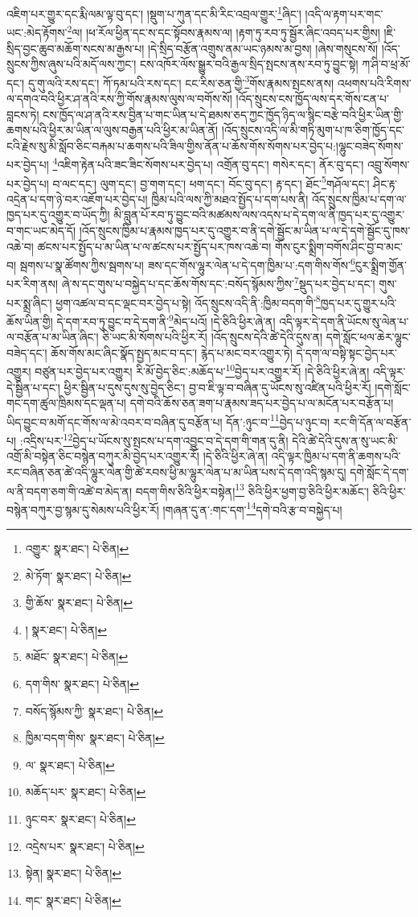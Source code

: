 འཇིག་པར་གྱུར་དང་རྨི་ལམ་ལྟ་བུ་དང་། །སྡུག་པ་ཀུན་དང་མི་རིང་འབྲལ་གྱུར་\footnote{འགྱུར་  སྣར་ཐང་།  པེ་ཅིན། }ཞིང་། །འདི་ལ་རྟག་པར་གང་ཡང་:མེད་རྟོགས་\footnote{མེ་ཏོག་  སྣར་ཐང་།  པེ་ཅིན། }ལ། །ཕ་རོལ་ཕྱིན་དང་ས་དང་སྟོབས་རྣམས་ལ། །རྟག་ཏུ་རབ་ཏུ་སྦྱོར་ཞིང་འབད་པར་གྱིས། །ཇི་སྲིད་བྱང་ཆུབ་མཆོག་སངས་མ་རྒྱས་པ། །དེ་སྲིད་བརྩོན་འགྲུས་ནམ་ཡང་ཉམས་མ་བྱས། །ཞེས་གསུངས་སོ། །འོད་སྲུངས་ཀྱིས་ཞུས་པའི་མདོ་ལས་ཀྱང་། ངས་འཁོར་ལོས་སྒྱུར་བའི་རྒྱལ་སྲིད་སྤངས་ནས་རབ་ཏུ་བྱུང་སྟེ། ཀ་ཤི་བ་ཕྲ་མོ་དང་། དུ་གུ་ལའི་རས་དང་། ཀོ་ཏམ་པའི་རས་དང་། ངང་རིས་ཅན་གྱི་\footnote{གྱི་ཆོས་  སྣར་ཐང་།  པེ་ཅིན། }གོས་རྣམས་སྤངས་ནས། འཕགས་པའི་རིགས་ལ་དགའ་བའི་ཕྱིར་ཤ་ནའི་རས་ཀྱི་གོས་རྣམས་ལུས་ལ་བགོས་སོ། །འོད་སྲུངས་ངས་ཁྱོད་ལས་དར་གོས་ངན་པ་བླངས་ཏེ། ངས་ཁྱོད་ལ་ཤ་ནའི་རས་བྱིན་པ་གང་ཡིན་པ་དེ་ཐམས་ཅད་ཀྱང་ཁྱོད་ཉིད་ལ་སྙིང་བརྩེ་བའི་ཕྱིར་ཡིན་གྱི་ཆགས་པའི་ཕྱིར་མ་ཡིན་ལ་ལུས་བརྒྱན་པའི་ཕྱིར་མ་ཡིན་ནོ། །འོད་སྲུངས་འདི་ལ་མི་གཏི་མུག་པ་ཁ་ཅིག་ཁྱོད་དང་ངའི་རྗེས་སུ་མི་སློབ་ཅིང་བརྐམ་པ་ཆགས་པའི་ཟིལ་གྱིས་ནོན་པ་ཆོས་གོས་སོགས་པར་བྱེད་པ:།ལྷུང་བཟེད་སོགས་པར་བྱེད་པ། \footnote{།   སྣར་ཐང་།  པེ་ཅིན། }འཇིག་རྟེན་པའི་ཟང་ཟིང་སོགས་པར་བྱེད་པ། འགྲོན་བུ་དང་། གསེར་དང་། ནོར་བུ་དང་། འབྲུ་སོགས་པར་བྱེད་པ། བ་ལང་དང་། ལུག་དང་། བྱ་གག་དང་། ཕག་དང་། བོང་བུ་དང་། རྟ་དང་། ཐོང་\footnote{མཐོང་  སྣར་ཐང་།  པེ་ཅིན། }གཤོལ་དང་། ཤིང་རྟ་འདྲེན་པ་དག་ཉེ་བར་འཇོག་པར་བྱེད་པ། ཁྱིམ་པའི་ལས་ཀྱི་མཐའ་སྤྱོད་པ་དག་པས་ནི། འོད་སྲུངས་ཁྱིམ་པ་དག་ལ་ཁྱད་པར་དུ་འགྱུར་བ་ཡོད་ཀྱི། མི་བླུན་པོ་རབ་ཏུ་བྱུང་བའི་མཚམས་ལས་འདས་པ་དེ་དག་ལ་ནི་ཁྱད་པར་དུ་འགྱུར་བ་གང་ཡང་མེད་དོ། །འོད་སྲུངས་ཁྱིམ་པ་རྣམས་ཁྱད་པར་དུ་འགྱུར་བ་ནི་དགེ་སྦྱོང་མ་ཡིན་པ་ལ་དེ་དགེ་སྦྱོང་དུ་ཁས་འཆེ་བ། ཚངས་པར་སྤྱོད་པ་མ་ཡིན་པ་ལ་ཚངས་པར་སྤྱོད་པར་ཁས་འཆེ་བ། གོས་ངུར་སྨྲིག་བགོས་ཤིང་བྱ་བ་མང་བ། སྦགས་པ་སྣ་ཚོགས་ཀྱིས་སྦགས་པ། ཟས་དང་གོས་ལྷུར་ལེན་པ་དེ་དག་ཁྱིམ་པ་:དག་གིས་གོས་\footnote{དག་གིས་  སྣར་ཐང་།  པེ་ཅིན། }ངུར་སྨྲིག་གྱོན་པར་རིག་ནས། ཞེ་ས་དང་གུས་པ་བསྐྱེད་པ་དང་ཆོས་གོས་དང་:བསོད་སྙོམས་ཀྱིས་\footnote{བསོད་སྙོམས་ཀྱི་  སྣར་ཐང་།  པེ་ཅིན། }སྡུད་པར་བྱེད་པ་དང་། གུས་པར་སྨྲ་ཞིང་། ཕྱག་འཚལ་བ་དང་ལྡང་བར་བྱེད་པ་སྟེ། འོད་སྲུངས་འདི་ནི་:ཁྱིམ་བདག་གི་\footnote{ཁྱིམ་བདག་གིས་  སྣར་ཐང་།  པེ་ཅིན། }ཁྱད་པར་དུ་གྱུར་པའི་ཆོས་ཡིན་གྱི། དེ་དག་རབ་ཏུ་བྱུང་བ་དེ་དག་ནི་\footnote{ལ་  སྣར་ཐང་།  པེ་ཅིན། }མེད་པའོ། །དེ་ཅིའི་ཕྱིར་ཞེ་ན། འདི་ལྟར་དེ་དག་ནི་ཡོངས་སུ་ལེན་པ་ལ་བརྩོན་པ་མ་ཡིན་ཞིང་། ཅི་ཡང་མི་སོགས་པའི་ཕྱིར་རོ། །འོད་སྲུངས་དེའི་ཚེ་དེའི་དུས་ན། དགེ་སློང་ཕལ་ཆེར་ལྷུང་བཟེད་དང་། ཆོས་གོས་མང་ཞིང་སྣོད་སྤྱད་མང་བ་དང་། རྙེད་པ་མང་བར་འགྱུར་ཏེ། དེ་དག་ལ་བསྟི་སྟང་བྱེད་པར་འགྱུར། བཙུན་པར་བྱེད་པར་འགྱུར། རི་མོ་བྱེད་ཅིང་:མཆོད་པ་\footnote{མཆོད་པར་  སྣར་ཐང་།  པེ་ཅིན། }བྱེད་པར་འགྱུར་རོ། །དེ་ཅིའི་ཕྱིར་ཞེ་ན། འདི་ལྟར་དེ་སྦྱིན་པ་དང་། ཕྱིར་སྦྱིན་པ་དུས་དུས་སུ་བྱེད་ཅིང་། བྱ་བ་ཇི་ལྟ་བ་བཞིན་དུ་ཡོངས་སུ་འཛིན་པའི་ཕྱིར་རོ། །དགེ་སློང་གང་དག་ཚུལ་ཁྲིམས་དང་ལྡན་པ། དགེ་བའི་ཆོས་ཅན་ཟག་པ་རྣམས་ཟད་པར་བྱེད་པ་ལ་མངོན་པར་བརྩོན་པ། ཡིད་བྱུང་བ་མགོ་དང་གོས་ལ་མེ་འབར་བ་བཞིན་དུ་བརྩོན་པ། དོན་:ཉུང་བ་\footnote{ཉུང་བར་  སྣར་ཐང་།  པེ་ཅིན། }བྱེད་པ་ཉུང་བ། རང་གི་དོན་ལ་བརྩོན་པ། :འདྲིས་པར་\footnote{འདྲེས་པར་  སྣར་ཐང་།  པེ་ཅིན། }བྱེད་པ་ཡོངས་སུ་སྤངས་པ་དག་འབྱུང་བ་དེ་དག་གི་གན་དུ་ནི། དེའི་ཚེ་དེའི་དུས་ན་སུ་ཡང་མི་འགྲོ་མི་བསྟེན་ཅིང་བསྙེན་བཀུར་མི་བྱེད་པར་འགྱུར་རོ། །དེ་ཅིའི་ཕྱིར་ཞེ་ན། འདི་ལྟར་ཁྱིམ་པ་དག་ནི་ཆགས་པའི་རང་བཞིན་ཅན་ཚེ་འདི་ལྷུར་ལེན་གྱི་ཚེ་རབས་ཕྱི་མ་ལྷུར་ལེན་པ་མ་ཡིན་པས་དེ་དག་འདི་སྙམ་དུ། དགེ་སློང་དེ་དག་ལ་ནི་བདག་ཅག་གི་འཚེ་བ་མེད་ན། བདག་གིས་ཅིའི་ཕྱིར་བསྟེན།\footnote{སྟེན།  སྣར་ཐང་།  པེ་ཅིན། } ཅིའི་ཕྱིར་ཕྱག་བྱ་ཅིའི་ཕྱིར་མཆོང་། ཅིའི་ཕྱིར་བསྙེན་བཀུར་བྱ་སྙམ་དུ་སེམས་པའི་ཕྱིར་རོ། །གཞན་དུ་ན་:གང་དག་\footnote{གང་  སྣར་ཐང་།  པེ་ཅིན། }དགེ་བའི་རྩ་བ་བསྐྱེད་པ། 